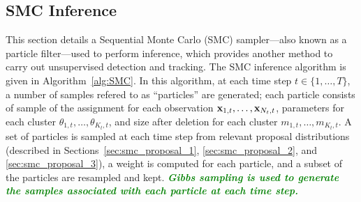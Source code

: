 \documentclass[smallcondensed, final]{svjour3}
\newcommand{\willie}[1]{\textcolor{green}{\textsf{\emph{\textbf{\textcolor{green}{#1}}}}}}
\begin{document}

\subsection{SMC Inference}
\label{sec:SMC}

This section details a Sequential Monte Carlo (SMC) sampler---also known as a particle filter---used to perform inference, which provides another method to carry out unsupervised detection and tracking. The SMC inference algorithm is given in Algorithm~\ref{alg:SMC}. In this algorithm, at each time step $t \in \{ 1, \ldots, T \}$, a number of samples refered to as ``particles'' are generated; each particle consists of sample of the assignment for each observation $\bold{x}_{1,t}, \ldots, \bold{x}_{N_{t}, t}$, parameters for each cluster $\theta_{1,t}, \ldots, \theta_{K_{t}, t}$, and size after deletion for each cluster $m_{1,t}, \ldots, m_{K_{t},t}$. A set of particles is sampled at each time step from relevant proposal distributions (described in Sections~\ref{sec:smc_proposal_1}, \ref{sec:smc_proposal_2}, and \ref{sec:smc_proposal_3}), a weight is computed for each particle, and a subset of the particles are resampled and kept. \willie{Gibbs sampling is used to generate the samples associated with each particle at each time step.}
\end{document}
